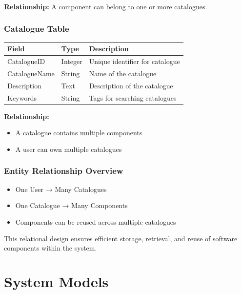 \documentclass[12pt]{scrreprt}
\begin{document}
\textbf{Relationship:} A component can belong to one or more catalogues.

\vspace{0.5cm}

\subsection{Catalogue Table}

\begin{longtable}{|p{3cm}|p{3cm}|p{7cm}|}
\hline
\textbf{Field} & \textbf{Type} & \textbf{Description} \\
\hline
CatalogueID & Integer & Unique identifier for catalogue \\
CatalogueName & String & Name of the catalogue \\
Description & Text & Description of the catalogue \\
Keywords & String & Tags for searching catalogues \\
\hline
\end{longtable}

\textbf{Relationship:}
\begin{itemize}
    \item A catalogue contains multiple components
    \item A user can own multiple catalogues
\end{itemize}

\vspace{0.5cm}

\subsection{Entity Relationship Overview}

\begin{itemize}
    \item One User → Many Catalogues
    \item One Catalogue → Many Components
    \item Components can be reused across multiple catalogues
\end{itemize}

This relational design ensures efficient storage, retrieval, and reuse of software components within the system.

\chapter{System Models}
\end{document}
